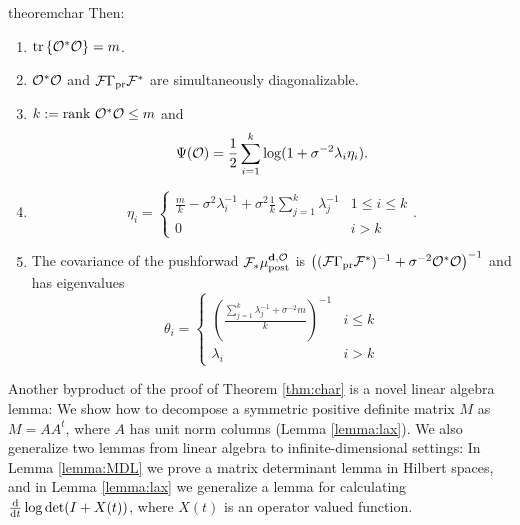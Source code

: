 \begin{restatable}{theorem}{char}
  Then:
  \begin{enumerate}
  \item  $\textup{tr}\left \{\mathcal{O}^*\mathcal{O} \right \} = m$.
  \item $\mathcal{O}^*\mathcal{O}$ and $\mathcal{F}\Gamma_{\textup{pr}}\mathcal{F}^*$ are simultaneously
    diagonalizable.
  \item $k := \textup{rank}\  \mathcal{O}^*\mathcal{O} \leq m$ and
    \begin{equation*}
      \tar(\obs) = \frac12 \sum_{i=1}^{k} \log (1 + \sigma^{-2}\lambda_i\eta_i). %
    \end{equation*}
  \item
    \begin{equation*}
        \eta_i = \begin{cases}
          \frac{m}{k} - \sigma^2 \lambda_i^{-1} + \sigma^2 \frac{1}{k} \sum_{j=1}^k \lambda_j^{-1} & 1 \leq i \leq k \\
          0 & i > k 
        \end{cases}.
    \end{equation*}
  \item The covariance of the pushforwad $\mathcal{F}_{*} \mu_{\textup{post}}^{\mathbf{d}, \mathcal{O}}$ is $\left (
    (\mathcal{F} \Gamma_{\textup{pr}} \mathcal{F}^*)^{-1} + \sigma^{-2} \mathcal{O}^*\mathcal{O} \right )^{-1}$
    and has eigenvalues
    \begin{equation*}
      \theta_i =
      \begin{cases}
        \left(\frac{\sum_{j=1}^k \lambda_j^{-1} + \sigma^{-2}m}{k} \right )^{-1} & i \leq k \\
        \lambda_i &  i > k 
      \end{cases}
    \end{equation*}
  \end{enumerate}
\end{restatable}

Another byproduct of the proof of Theorem \ref{thm:char} is a novel
linear algebra lemma: We show how to decompose a symmetric positive
definite matrix $M$ as $M = AA^t$, where $A$ has unit norm columns
(Lemma \ref{lemma:lax}). We also generalize two lemmas from linear
algebra to infinite-dimensional settings: In Lemma \ref{lemma:MDL} we
prove a matrix determinant lemma in Hilbert spaces, and in Lemma
\ref{lemma:lax} we generalize a lemma \cite{Lax07} for calculating
$\frac{\text{\textup{d}}}{\text{\textup{d}} t} \log \det (I + X(t))$, where $X(t)$ is an
operator valued function.

